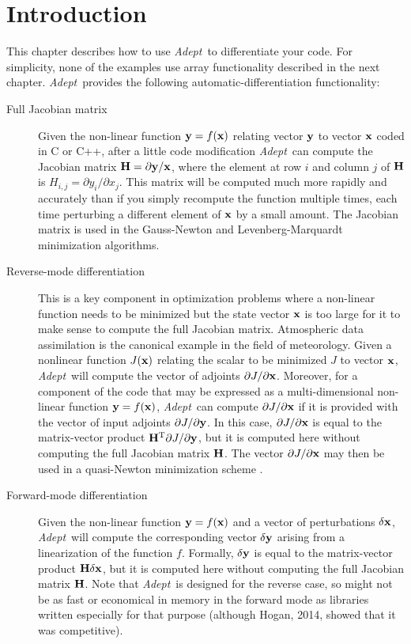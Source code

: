 \documentclass[a4,oneside]{book}
\def\x{\ensuremath{{\bf x}}}
\def\y{\ensuremath{{\bf y}}}
\def\H{\ensuremath{{\bf H}}}
\def\T{\ensuremath{^\mathrm{T}}}
\def\Adept{\emph{Adept}}
\begin{document}
\section{Introduction}
\label{sec:ad_functionality}
This chapter describes how to use \Adept\ to differentiate your code.
For simplicity, none of the examples use array functionality described
in the next chapter. \Adept\ provides the following
automatic-differentiation functionality:
%
\begin{description}
\item[Full Jacobian matrix] Given the non-linear function $\y=f(\x)$
  relating vector $\y$ to vector $\x$ coded in C or C++, after a
  little code modification \Adept\ can compute the Jacobian matrix
  $\H=\partial\y/\x$, where the element at row $i$ and column $j$ of
  $\H$ is $H_{i,j}=\partial y_i/\partial x_j$. This matrix will be
  computed much more rapidly and accurately than if you simply
  recompute the function multiple times, each time perturbing a
  different element of $\x$ by a small amount. The Jacobian matrix is
  used in the Gauss-Newton and Levenberg-Marquardt minimization
  algorithms.
\item[Reverse-mode differentiation] This is a key component in
  optimization problems where a non-linear function needs to be
  minimized but the state vector $\x$ is too large for it to make
  sense to compute the full Jacobian matrix. Atmospheric data
  assimilation is the canonical example in the field of
  meteorology. Given a nonlinear function $J(\x)$ relating the
  scalar to be minimized $J$ to vector $\x$, \Adept\ will compute the
  vector of adjoints $\partial J/\partial\x$. Moreover, for a
  component of the code that may be expressed as a multi-dimensional
  non-linear function $\y=f(\x)$, \Adept\ can compute $\partial
  J/\partial\x$ if it is provided with the vector of input adjoints
  $\partial J/\partial\y$.  In this case, $\partial J/\partial\x$ is
  equal to the matrix-vector product $\H\T\partial J/\partial\y$, but
  it is computed here without computing the full Jacobian matrix
  $\H$. The vector $\partial J/\partial\x$ may then be used in a
  quasi-Newton minimization scheme \cite[e.g.,][]{Liu+1989}.
\item[Forward-mode differentiation] Given the non-linear function
  $\y=f(\x)$ and a vector of perturbations $\delta\x$, \Adept\ will
  compute the corresponding vector $\delta\y$ arising from a
  linearization of the function $f$. Formally, $\delta\y$ is equal
  to the matrix-vector product $\H\delta\x$, but it is computed here
  without computing the full Jacobian matrix $\H$. Note that
  \Adept\ is designed for the reverse case, so might not be as fast
  or economical in memory in the forward mode as libraries written
  especially for that purpose (although Hogan, 2014, showed that it
  was competitive).
\end{description}%
\end{document}
